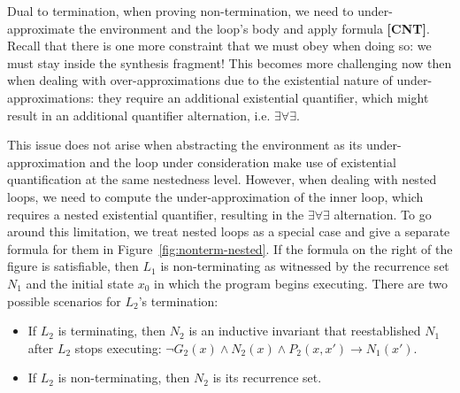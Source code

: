 \documentclass[preprint]{sigplanconf}
\theoremstyle{definition}
\begin{document}
Dual to termination, when proving non-termination, we need to under-approximate the environment and the loop's body and apply
formula {\bf [CNT]}. %
Recall that there is one more constraint that we must obey when doing so: we must stay inside the synthesis fragment! 
This becomes more challenging now then when dealing with over-approximations due to the existential nature of under-approximations: they require an additional existential quantifier, which might result in an additional quantifier alternation, i.e. $\exists \forall \exists$. 

This issue does not arise when abstracting the environment as its under-approximation and the loop under consideration make use of existential quantification at the same nestedness level. However, when dealing with nested loops, we need to compute the under-approximation of the inner loop, which requires a nested existential quantifier, 
resulting in the $\exists \forall \exists$ alternation. 
To go around this limitation, we treat nested loops as a special case and give a separate formula for them in Figure~\ref{fig:nonterm-nested}. If the formula on the right of the figure is satisfiable, then $L_1$ is non-terminating as witnessed by the recurrence set $N_1$ and
the initial state $x_0$ in which the program begins executing. There are two possible scenarios for $L_2$'s termination:
\begin{itemize}
\item If $L_2$ is terminating, then $N_2$ is an inductive invariant that reestablished $N_1$ after $L_2$ stops executing: $\lnot G_2(x) \wedge N_2(x) \wedge P_2(x,x') \rightarrow N_1(x') $. 
\item If $L_2$ is non-terminating, then $N_2$ is its recurrence set.
\end{itemize}


\end{document}
